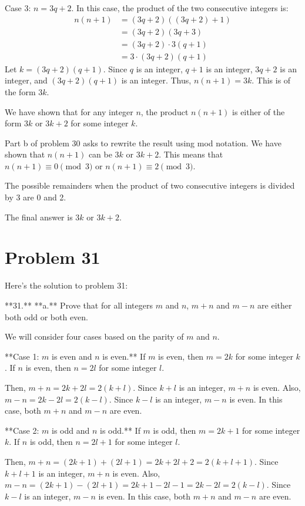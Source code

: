 \documentclass{article}
\begin{document}
Case 3: $n = 3q + 2$.
In this case, the product of the two consecutive integers is:
\begin{align*} n(n+1) &= (3q+2)((3q+2)+1) \\ &= (3q+2)(3q+3) \\ &= (3q+2) \cdot 3(q+1) \\ &= 3 \cdot (3q+2)(q+1) \end{align*}
Let $k = (3q+2)(q+1)$. Since $q$ is an integer, $q+1$ is an integer, $3q+2$ is an integer, and $(3q+2)(q+1)$ is an integer.
Thus, $n(n+1) = 3k$. This is of the form $3k$.

We have shown that for any integer $n$, the product $n(n+1)$ is either of the form $3k$ or $3k+2$ for some integer $k$.

Part b of problem 30 asks to rewrite the result using mod notation.
We have shown that $n(n+1)$ can be $3k$ or $3k+2$.
This means that $n(n+1) \equiv 0 \pmod{3}$ or $n(n+1) \equiv 2 \pmod{3}$.

The possible remainders when the product of two consecutive integers is divided by 3 are 0 and 2.

The final answer is $\boxed{3k \text{ or } 3k+2}$.

\newpage

\section*{Problem 31}
Here's the solution to problem 31:

**31.**
**a.** Prove that for all integers $m$ and $n$, $m+n$ and $m-n$ are either both odd or both even.

We will consider four cases based on the parity of $m$ and $n$.

**Case 1: $m$ is even and $n$ is even.**
If $m$ is even, then $m = 2k$ for some integer $k$.
If $n$ is even, then $n = 2l$ for some integer $l$.

Then, $m+n = 2k + 2l = 2(k+l)$. Since $k+l$ is an integer, $m+n$ is even.
Also, $m-n = 2k - 2l = 2(k-l)$. Since $k-l$ is an integer, $m-n$ is even.
In this case, both $m+n$ and $m-n$ are even.

**Case 2: $m$ is odd and $n$ is odd.**
If $m$ is odd, then $m = 2k+1$ for some integer $k$.
If $n$ is odd, then $n = 2l+1$ for some integer $l$.

Then, $m+n = (2k+1) + (2l+1) = 2k + 2l + 2 = 2(k+l+1)$. Since $k+l+1$ is an integer, $m+n$ is even.
Also, $m-n = (2k+1) - (2l+1) = 2k + 1 - 2l - 1 = 2k - 2l = 2(k-l)$. Since $k-l$ is an integer, $m-n$ is even.
In this case, both $m+n$ and $m-n$ are even.
\end{document}
